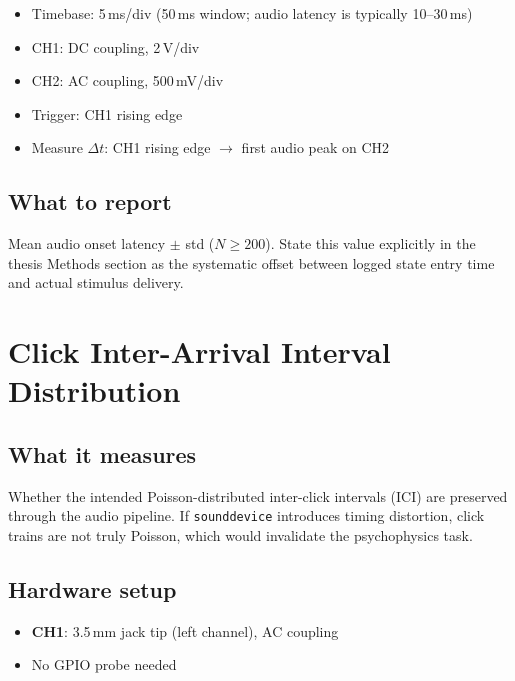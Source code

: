 \documentclass[11pt, a4paper]{article}
\begin{document}
\begin{itemize}[noitemsep]
    \item Timebase: 5\,ms/div (50\,ms window; audio latency is typically 10--30\,ms)
    \item CH1: DC coupling, 2\,V/div
    \item CH2: AC coupling, 500\,mV/div
    \item Trigger: CH1 rising edge
    \item Measure $\Delta t$: CH1 rising edge $\rightarrow$ first audio peak on CH2
\end{itemize}

\subsection*{What to report}

Mean audio onset latency $\pm$ std ($N \geq 200$). State this value explicitly
in the thesis Methods section as the systematic offset between logged state
entry time and actual stimulus delivery.

\newpage

\section{Click Inter-Arrival Interval Distribution}

\subsection*{What it measures}

Whether the intended Poisson-distributed inter-click intervals (ICI) are
preserved through the audio pipeline. If \texttt{sounddevice} introduces
timing distortion, click trains are not truly Poisson, which would invalidate
the psychophysics task.

\subsection*{Hardware setup}

\begin{itemize}[noitemsep]
    \item \textbf{CH1}: 3.5\,mm jack tip (left channel), AC coupling
    \item No GPIO probe needed
\end{itemize}
\end{document}
